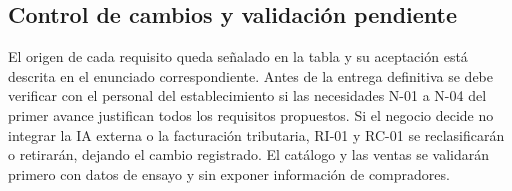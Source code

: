 \subsection{Control de cambios y validación pendiente}
El origen de cada requisito queda señalado en la tabla y su aceptación está descrita en el enunciado correspondiente. Antes de la entrega definitiva se debe verificar con el personal del establecimiento si las necesidades N-01 a N-04 del primer avance justifican todos los requisitos propuestos. Si el negocio decide no integrar la IA externa o la facturación tributaria, RI-01 y RC-01 se reclasificarán o retirarán, dejando el cambio registrado. El catálogo y las ventas se validarán primero con datos de ensayo y sin exponer información de compradores.
